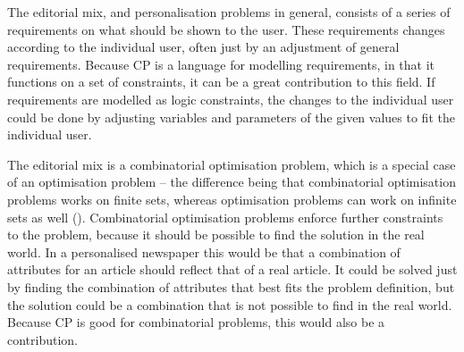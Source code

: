 The editorial mix, and personalisation problems in general, consists of a series of requirements on what should be shown to the user. These requirements changes according to the individual user, often just by an adjustment of general requirements. Because CP is a language for modelling requirements, in that it functions on a set of constraints, it can be a great contribution to this field. If requirements are modelled as logic constraints, the changes to the individual user could be done by adjusting variables and parameters of the given values to fit the individual user.

The editorial mix is a combinatorial optimisation problem, which is a special case of an optimisation problem -- the difference being that combinatorial optimisation problems works on finite sets, whereas optimisation problems can work on infinite sets as well (\cite{schrijver2003combinatorial}). Combinatorial optimisation problems enforce further constraints to the problem, because it should be possible to find the solution in the real world. In a personalised newspaper this would be that a combination of attributes for an article should reflect that of a real article. It could be solved just by finding the combination of attributes that best fits the problem definition, but the solution could be a combination that is not possible to find in the real world. Because CP is good for combinatorial problems, this would also be a contribution.

